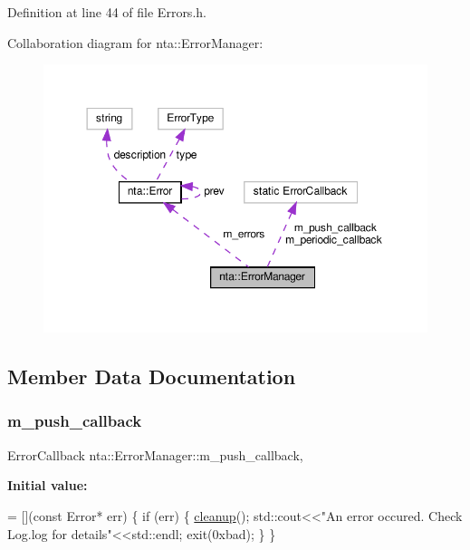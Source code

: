 Definition at line 44 of file Errors.\+h.



Collaboration diagram for nta\+:\+:Error\+Manager\+:\nopagebreak
\begin{figure}[H]
\begin{center}
\leavevmode
\includegraphics[width=350pt]{d5/d79/classnta_1_1ErrorManager__coll__graph}
\end{center}
\end{figure}


\subsection{Member Data Documentation}
\mbox{\label{classnta_1_1ErrorManager_a96ac1ed4fb4ee3dd2ca4c055ccfc630c}} 
\subsubsection{\texorpdfstring{m\+\_\+push\+\_\+callback}{m\_push\_callback}}
{\footnotesize\ttfamily Error\+Callback nta\+::\+Error\+Manager\+::m\+\_\+push\+\_\+callback\hspace{0.3cm}{\ttfamily [static]}, {\ttfamily [private]}}

{\bfseries Initial value\+:}
\begin{DoxyCode}
= [](\textcolor{keyword}{const} Error* err) \{
        \textcolor{keywordflow}{if} (err) \{
            \hyperlink{namespacenta_a17dc16b021d0dec3749e422b95d39350}{cleanup}();
            std::cout<<\textcolor{stringliteral}{"An error occured. Check Log.log for details"}<<std::endl;
            exit(0xbad);
        \}
    \}
\end{DoxyCode}


